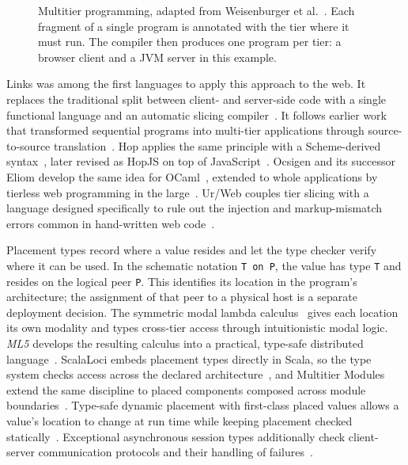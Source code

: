 \begin{figure}[t]
    \centering
    
    \caption[Multitier programming]{
        Multitier programming, adapted from Weisenburger et al.~\cite{DBLP:journals/csur/WeisenburgerWS20}.
        Each fragment of a single program is annotated with the tier where it must run.
        The compiler then produces one program per tier: a browser client and a JVM server in this example.}
    \label{fig:multitier-programming}
\end{figure}

Links was among the first languages to apply this approach to the web.
It replaces the traditional split between client- and server-side code with a single functional language and an automatic slicing compiler~\cite{DBLP:conf/fmco/CooperLWY06}.
It follows earlier work that transformed sequential programs into multi-tier applications through source-to-source translation~\cite{10.1145/1040305.1040324}.
%
Hop applies the same principle with a Scheme-derived syntax~\cite{DBLP:conf/oopsla/SerranoGL06},
later revised as HopJS on top of JavaScript~\cite{10.1145/2951913.2951916}.
%
Ocsigen and its successor Eliom develop the same idea for OCaml~\cite{10.1145/1159876.1159889,Radanne:2016},
extended to whole applications by tierless web programming in the large~\cite{10.1145/3184558.3185953}.
%
Ur/Web couples tier slicing with a language designed specifically to rule out the injection and markup-mismatch errors common in hand-written web code~\cite{10.1145/2676726.2677004}.

Placement types record where a value resides and let the type checker verify where it can be used.
In the schematic notation \texttt{T on P},
the value has type \texttt{T} and resides on the logical peer \texttt{P}.
This identifies its location in the program's architecture;
the assignment of that peer to a physical host is a separate deployment decision.
%
The symmetric modal lambda calculus~\cite{10.5555/1018438.1021865,Sim94} gives each location its own modality
and types cross-tier access through intuitionistic modal logic.
\emph{ML5} develops the resulting calculus into a practical, type-safe distributed language~\cite{10.5555/1793574.1793585}.
%
ScalaLoci embeds placement types directly in Scala,
so the type system checks access across the declared architecture~\cite{DBLP:journals/pacmpl/WeisenburgerKS18},
and Multitier Modules extend the same discipline to placed components composed across module boundaries~\cite{Weisenburger:2019:Multitier}.
%
Type-safe dynamic placement with first-class placed values allows a value's location to change at run time while keeping placement checked statically~\cite{Zakhour:2023:TypeSafe}.
%
Exceptional asynchronous session types additionally check client-server communication protocols and their handling of failures~\cite{10.1145/3290341}.

